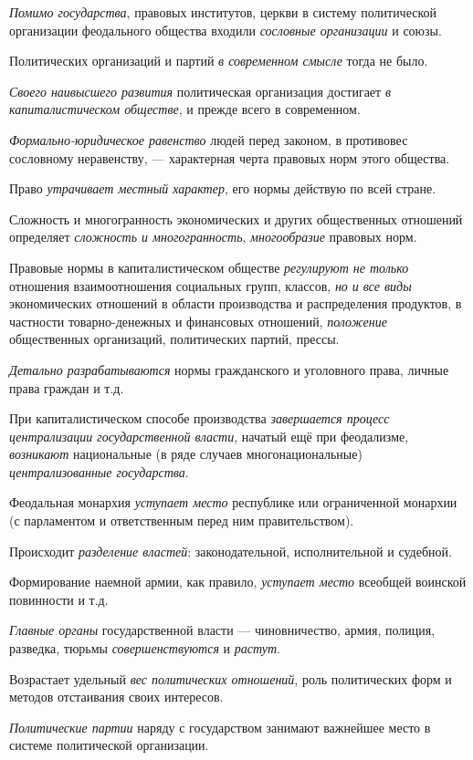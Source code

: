 \documentclass[a4paper,14pt,russian]{extreport}
\begin{document}
\emph{Помимо государства}, правовых институтов, церкви в систему политической организации феодального общества входили \emph{сословные организации} и союзы.

Политических организаций и партий \emph{в современном смысле} тогда не было.

\emph{Своего наивысшего развития} политическая организация достигает \emph{в капиталистическом обществе}, и прежде всего в современном.

\emph{Формально-юридическое равенство} людей перед законом, в противовес сословному неравенству, --- характерная черта правовых норм этого общества.

Право \emph{утрачивает местный характер}, его нормы действую по всей стране.

Сложность и многогранность экономических и других общественных отношений определяет \emph{сложность и многогранность}, \emph{многообразие} правовых норм.

Правовые нормы в капиталистическом обществе \emph{регулируют не только} отношения взаимоотношения социальных групп, классов, \emph{но и все виды} экономических отношений в области производства и распределения продуктов, в частности товарно-денежных и финансовых отношений, \emph{положение} общественных организаций, политических партий, прессы.

\emph{Детально разрабатываются} нормы гражданского и уголовного права, личные права граждан и т.д.

При капиталистическом способе производства \emph{завершается процесс централизации государственной власти}, начатый ещё при феодализме, \emph{возникают} национальные (в ряде случаев многонациональные) \emph{централизованные государства}.

Феодальная монархия \emph{уступает место} республике или ограниченной монархии (с парламентом и ответственным перед ним правительством).

Происходит \emph{разделение властей}: законодательной, исполнительной и судебной.

Формирование наемной армии, как правило, \emph{уступает место} всеобщей воинской повинности и т.д.

\emph{Главные органы} государственной власти --- чиновничество, армия, полиция, разведка, тюрьмы \emph{совершенствуются} и \emph{растут}.

Возрастает удельный \emph{вес политических отношений}, роль политических форм и методов отстаивания своих интересов.

\emph{Политические партии} наряду с государством занимают важнейшее место в системе политической организации.
\end{document}
